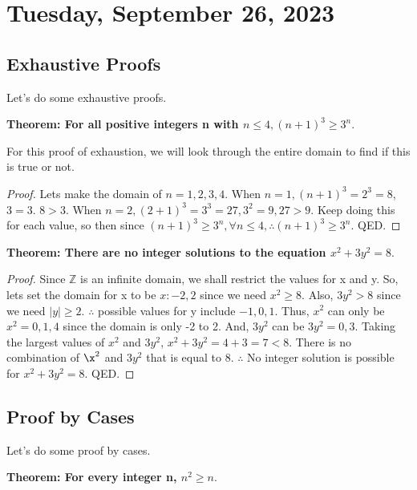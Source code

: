 \section{Tuesday, September 26, 2023}
\subsection{Exhaustive Proofs}
Let's do some exhaustive proofs.

\begin{example}
    \textbf{Theorem: For all positive integers n with $n\leq 4, (n+1)^3 \geq 3^n$}.
\end{example}

For this proof of exhaustion, we will look through the entire domain to find if this is true or not.

\begin{proof}
    Lets make the domain of $n = {1,2,3,4}$. When $n=1, (n+1)^3=2^3=8$, $3=3$. $8>3$. When $n=2, (2+1)^3=3^3=27, 3^2=9, 27>9$. Keep doing this for each value, so then since $(n+1)^3 \geq 3^n, \forall n \leq 4, \therefore (n+1)^3 \geq 3^n$. QED.
\end{proof}

\begin{example}
\textbf{Theorem: There are no integer solutions to the equation $x^2+3y^2=8$}.
\end{example}

\begin{proof}
Since $\mathbb{Z}$ is an infinite domain, we shall restrict the values for x and y. So, lets set the domain for x to be $x: {-2,2}$ since we need $x^2 \geq 8$. Also, $3y^2>8$ since we need $|y| \geq 2$. $\therefore$ possible values for y include $-1, 0, 1$. Thus, $x^2$ can only be $x^2={0,1,4}$ since the domain is only -2 to 2. And, $3y^2$ can be $3y^2= {0,3}$. Taking the largest values of $x^2$ and $3y^2$, $x^2+3y^2=4+3=7<8$. There is no combination of $\x^2$ and $3y^2$ that is equal to 8. $\therefore$ No integer solution is possible for $x^2+3y^2=8$. QED.
\end{proof}

\subsection{Proof by Cases}
Let's do some proof by cases.

\begin{example}
    \textbf{Theorem: For every integer n, $n^2 \geq n$}.
\end{example}

